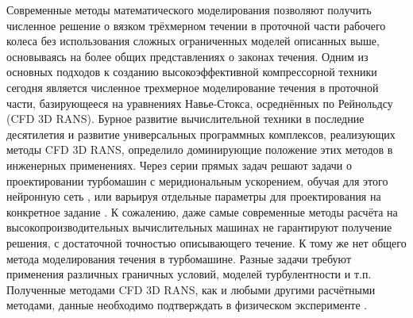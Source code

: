 Современные методы математического моделирования позволяют получить численное решение о вязком трёхмерном течении в проточной части рабочего колеса без использования сложных ограниченных моделей описанных выше, основываясь на более общих представлениях о законах течения. Одним из основных подходов к созданию высокоэффективной компрессорной техники сегодня является численное трехмерное моделирование течения в проточной части, базирующееся на уравнениях Навье-Стокса, осреднённых по Рейнольдсу (CFD 3D RANS). Бурное развитие вычислительной техники в последние десятилетия и развитие универсальных программных комплексов, реализующих методы CFD 3D RANS, определило доминирующие положение этих методов в инженерных применениях. Через серии прямых задач решают задачи о проектировании турбомашин с меридиональным ускорением, обучая для этого нейронную сеть \cite{Bamberger2017}, или варьируя отдельные параметры для проектирования на конкретное задание \cite{Qiushi2010,Kim2018}. К сожалению, даже самые современные методы расчёта на высокопроизводительных вычислительных машинах не гарантируют получение решения, с достаточной точностью описывающего течение. К тому же нет общего метода моделирования течения в турбомашине. Разные задачи требуют применения различных граничных условий, моделей турбулентности и т.п. Полученные методами CFD 3D RANS, как и любыми другими расчётными методами, данные необходимо подтверждать в физическом эксперименте \cite{Michaud2016,Pandya2020}. 

\FloatBarrier
